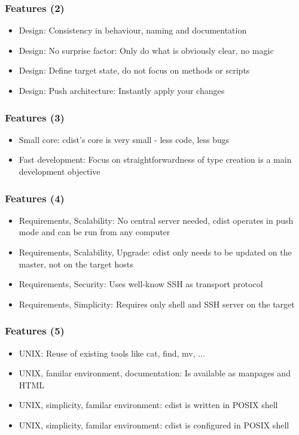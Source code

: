 \documentclass{beamer}
\begin{document}
\begin{frame}
   \frametitle{Features (2)}
   \begin{itemize}
\item Design:  Consistency in behaviour, naming and documentation
\item Design:  No surprise factor: Only do what is obviously clear, no magic
\item Design:  Define target state, do not focus on methods or scripts
\item Design:  Push architecture: Instantly apply your changes
   \end{itemize}
\end{frame}

\begin{frame}[fragile]
   \frametitle{Features (3)}
   \begin{itemize}
\item Small core: cdist's core is very small - less code, less bugs
\item Fast development: Focus on straightforwardness of type creation is a main development objective
   \end{itemize}
\end{frame}
\begin{frame}[fragile]
   \frametitle{Features (4)}
   \begin{itemize}
\item Requirements, Scalability: No central server needed, cdist operates in push mode and can be run from any computer
\item Requirements, Scalability, Upgrade: cdist only needs to be updated on the master, not on the target hosts
\item Requirements, Security: Uses well-know SSH as transport protocol
\item Requirements, Simplicity:  Requires only shell and SSH server on the target
   \end{itemize}
\end{frame}

\begin{frame}
   \frametitle{Features (5)}
   \begin{itemize}
\item UNIX: Reuse of existing tools like cat, find, mv, ...
\item UNIX, familar environment, documentation: Is available as manpages and HTML
\item UNIX, simplicity, familar environment: cdist is written in POSIX shell
\item UNIX, simplicity, familar environment: cdist is configured in POSIX shell
   \end{itemize}
\end{frame}
\end{document}
